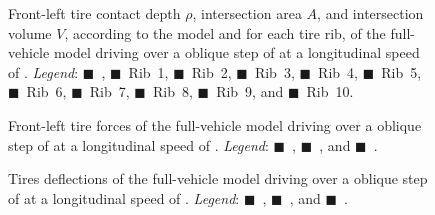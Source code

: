 \begin{figure}[htp]
  \centering
  \caption[Front-left bla bla]{Front-left tire contact depth $\rho$, intersection area $A$, and intersection volume $V$, according to the \Enve{} model and for each tire rib, of the full-vehicle model driving over a  oblique step of  at a longitudinal speed of . \emph{Legend}: {\color{black}$\blacksquare$}~\Enve{}, {\color{mycolor1}$\blacksquare$}~Rib~1, {\color{mycolor2}$\blacksquare$}~Rib~2, {\color{mycolor3}$\blacksquare$}~Rib~3, {\color{mycolor4}$\blacksquare$}~Rib~4, {\color{mycolor5}$\blacksquare$}~Rib~5, {\color{mycolor6}$\blacksquare$}~Rib~6, {\color{mycolor7}$\blacksquare$}~Rib~7, {\color{mycolor1}$\blacksquare$}~Rib~8, {\color{mycolor2}$\blacksquare$}~Rib~9, and {\color{mycolor3}$\blacksquare$}~Rib~10.}
  \label{chap3:fig:rho_area_vol}
\end{figure}

\begin{figure}[htp]
  \centering
  \caption{Front-left tire forces of the full-vehicle model driving over a  oblique step of  at a longitudinal speed of . \emph{Legend}: {\color{mycolor1}$\blacksquare$}~\Enve{}, {\color{mycolor2}$\blacksquare$}~\Swift{}, and {\color{mycolor3}$\blacksquare$}~\TMEasy{}.}
  \label{chap3:fig:forces}
\end{figure}

\begin{figure}[htp]
  \centering
  \caption{Tires deflections of the full-vehicle model driving over a  oblique step of  at a longitudinal speed of . \emph{Legend}: {\color{mycolor1}$\blacksquare$}~\Enve{}, {\color{mycolor2}$\blacksquare$}~\Swift{}, and {\color{mycolor3}$\blacksquare$}~\TMEasy{}.}
  \label{chap3:fig:rho}
\end{figure}

